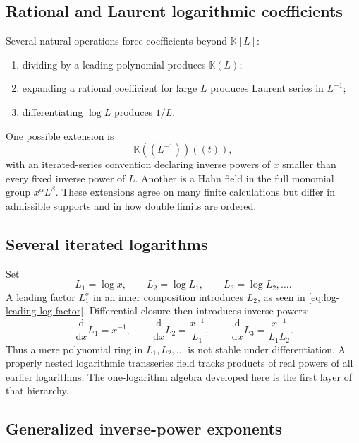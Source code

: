 \documentclass[11pt]{article}
\theoremstyle{pltheorem}
\newcommand{\K}{\mathbb K}
\newcommand{\dd}{\,\mathrm d}
\newcommand{\D}{\frac{\dd}{\dd x}}
\begin{document}
\subsection{Rational and Laurent logarithmic coefficients}

Several natural operations force coefficients beyond \(\K[L]\):
\begin{enumerate}
\item dividing by a leading polynomial produces \(\K(L)\);
\item expanding a rational coefficient for large \(L\) produces Laurent series in \(L^{-1}\);
\item differentiating \(\log L\) produces \(1/L\).
\end{enumerate}
One possible extension is
\begin{equation}\label{eq:Linv-extension}
 \K((L^{-1}))((t)),
\end{equation}
with an iterated-series convention declaring inverse powers of \(x\) smaller than every fixed inverse power of \(L\).  Another is a Hahn field in the full monomial group \(x^\alpha L^\beta\).  These extensions agree on many finite calculations but differ in admissible supports and in how double limits are ordered.

\subsection{Several iterated logarithms}

Set
\begin{equation}\label{eq:iterated-logs}
 L_1=\log x,
 \qquad L_2=\log L_1,
 \qquad L_3=\log L_2,\ldots.
\end{equation}
A leading factor \(L_1^\sigma\) in an inner composition introduces \(L_2\), as seen in \cref{eq:log-leading-log-factor}.  Differential closure then introduces inverse powers:
\begin{equation}\label{eq:iterated-log-derivatives}
 \D L_1=x^{-1},
 \qquad
 \D L_2=\frac{x^{-1}}{L_1},
 \qquad
 \D L_3=\frac{x^{-1}}{L_1L_2}.
\end{equation}
Thus a mere polynomial ring in \(L_1,L_2,\ldots\) is not stable under differentiation.  A properly nested logarithmic transseries field tracks products of real powers of all earlier logarithms.  The one-logarithm algebra developed here is the first layer of that hierarchy.

\subsection{Generalized inverse-power exponents}
\end{document}
